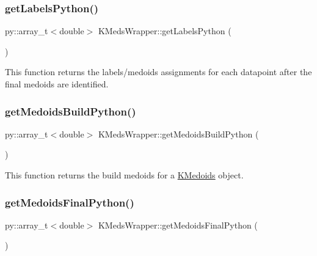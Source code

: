 \subsubsection{\texorpdfstring{get\+Labels\+Python()}{getLabelsPython()}}
{\footnotesize\ttfamily py\+::array\+\_\+t$<$double$>$ K\+Meds\+Wrapper\+::get\+Labels\+Python (\begin{DoxyParamCaption}{ }\end{DoxyParamCaption})\hspace{0.3cm}{\ttfamily [inline]}}

This function returns the labels/medoids assignments for each datapoint after the final medoids are identified. \mbox{\label{classKMedsWrapper_af272debff6f3b31490d20b8dc7bec322}} 
\subsubsection{\texorpdfstring{get\+Medoids\+Build\+Python()}{getMedoidsBuildPython()}}
{\footnotesize\ttfamily py\+::array\+\_\+t$<$double$>$ K\+Meds\+Wrapper\+::get\+Medoids\+Build\+Python (\begin{DoxyParamCaption}{ }\end{DoxyParamCaption})\hspace{0.3cm}{\ttfamily [inline]}}

This function returns the build medoids for a \hyperlink{classKMedoids}{K\+Medoids} object. \mbox{\label{classKMedsWrapper_ae825241c43b8bf92912eb59cd12ae1c5}} 
\subsubsection{\texorpdfstring{get\+Medoids\+Final\+Python()}{getMedoidsFinalPython()}}
{\footnotesize\ttfamily py\+::array\+\_\+t$<$double$>$ K\+Meds\+Wrapper\+::get\+Medoids\+Final\+Python (\begin{DoxyParamCaption}{ }\end{DoxyParamCaption})\hspace{0.3cm}{\ttfamily [inline]}}

